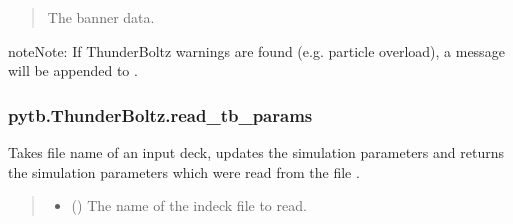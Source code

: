 \documentclass[letterpaper,10pt,english,openany,oneside]{sphinxmanual}
\begin{document}
\begin{fulllineitems}
\begin{fulllineitems}
\begin{quote}
\begin{description}
\sphinxAtStartPar
The banner data.

\sphinxAtStartPar
{}

\end{description}\end{quote}

\begin{sphinxadmonition}{note}{Note:}
\sphinxAtStartPar
If ThunderBoltz warnings are found (e.g. particle overload),
a message will be appended to .
\end{sphinxadmonition}

\end{fulllineitems}


\sphinxstepscope


\subsubsection{pytb.ThunderBoltz.read\_tb\_params}
\label{\detokenize{api/pytb.ThunderBoltz.read_tb_params:pytb-thunderboltz-read-tb-params}}\label{\detokenize{api/pytb.ThunderBoltz.read_tb_params::doc}}

\begin{fulllineitems}
\label{\detokenize{api/pytb.ThunderBoltz.read_tb_params:pytb.ThunderBoltz.read_tb_params}}
\pysigstartsignatures
{}
\pysigstopsignatures
\sphinxAtStartPar
Takes file name of an input deck, updates the simulation
parameters and returns the simulation parameters which were
read from the file .
\begin{quote}\begin{description}
\begin{itemize}
\item {} 
\sphinxAtStartPar
{} () \textendash{} The name of the indeck file to read.


\end{itemize}
\end{description}
\end{quote}
\end{fulllineitems}
\end{fulllineitems}
\end{document}
